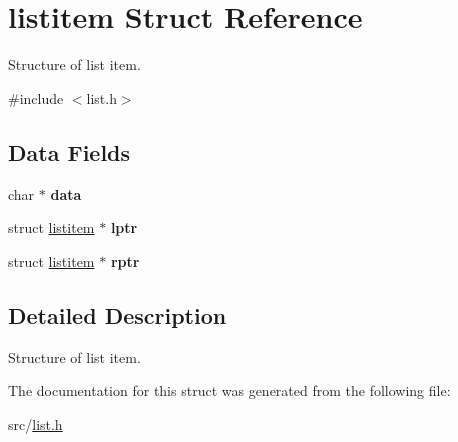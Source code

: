 \hypertarget{structlistitem}{}\section{listitem Struct Reference}
\label{structlistitem}


Structure of list item.  




{\ttfamily \#include $<$list.\+h$>$}

\subsection*{Data Fields}
\begin{DoxyCompactItemize}
\item 
\mbox{\label{structlistitem_abdab06a77692869ce1cd9ae5e777ebed}} 
char $\ast$ {\bfseries data}
\item 
\mbox{\label{structlistitem_a171d9ee532b124149e0126b07a45f984}} 
struct \hyperlink{structlistitem}{listitem} $\ast$ {\bfseries lptr}
\item 
\mbox{\label{structlistitem_a55d6cb7bc2e2a280b7700ebec5c00a52}} 
struct \hyperlink{structlistitem}{listitem} $\ast$ {\bfseries rptr}
\end{DoxyCompactItemize}


\subsection{Detailed Description}
Structure of list item. 

The documentation for this struct was generated from the following file\+:\begin{DoxyCompactItemize}
\item 
src/\hyperlink{list_8h}{list.\+h}\end{DoxyCompactItemize}
